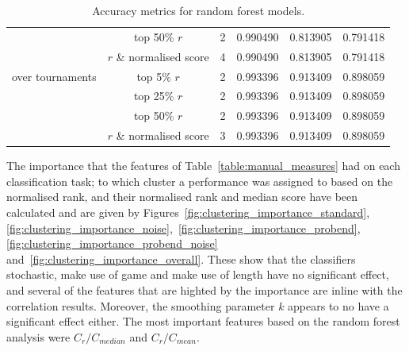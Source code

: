 \documentclass{article}
\newcommand{\numberofalltournaments}{}
\begin{document}
\begin{table}[!htbp]
\begin{center}
{\begin{tabular}{lccccc}
                               & top 50\% $r$             & 2 & 0.990490  & 0.813905 & 0.791418\\
                               & $r$  \& normalised score & 4 & 0.990490  & 0.813905 & 0.791418\\
    \midrule
    over \numberofalltournaments tournaments & top 5\% $r$               & 2 & 0.993396 & 0.913409 & 0.898059 \\
                                             & top 25\% $r$              & 2 & 0.993396 & 0.913409 & 0.898059 \\
                                             & top 50\% $r$              & 2 & 0.993396 & 0.913409 & 0.898059 \\
                                             & $r$  \& normalised score  & 3 & 0.993396 & 0.913409 & 0.898059 \\
    \bottomrule
        \end{tabular}}
    \end{center}
    \caption{Accuracy metrics for random forest models.}
    \label{table:accuracy_random_forest}
\end{table}

The importance that the features of Table~\ref{table:manual_measures} had on
each classification task; to which cluster a performance was assigned to based
on the normalised rank, and their normalised rank and median score have been
calculated and are given by Figures~\ref{fig:clustering_importance_standard},
\ref{fig:clustering_importance_noise},~\ref{fig:clustering_importance_probend},
\ref{fig:clustering_importance_probend_noise}
and~\ref{fig:clustering_importance_overall}. These show that the classifiers
stochastic, make use of game and make use of length have no significant effect,
and several of the features that are highted by the importance are inline with
the correlation results. Moreover, the smoothing parameter \(k\) appears to no
have a significant effect either. The most important features based on the
random forest analysis were $C_{r} / C_{median}$ and $C_r / C_{mean}$.
\end{document}
